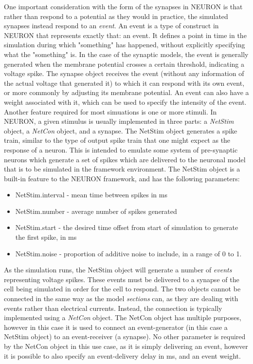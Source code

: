 One important consideration with the form of the synapses in NEURON is that rather than respond to a potential as they would in practice, the simulated synapses instead respond to an \emph{event}. An event is a type of construct in NEURON that represents exactly that: an event. It defines a point in time in the simulation during which "something" has happened, without explicitly specifying what the "something" is. In the case of the synaptic models, the event is generally generated when the membrane potential crosses a certain threshold, indicating a voltage spike. The synapse object receives the event (without any information of the actual voltage that generated it) to which it can respond with its own event, or more commonly by adjusting its membrane potential. An event can also have a weight associated with it, which can be used to specify the intensity of the event.
\\
Another feature required for most simuations is one or more stimuli. In NEURON, a given stimulus is usually implemented in three parts: a \emph{NetStim} object, a \emph{NetCon} object, and a synapse. The NetStim object generates a spike train, similar to the type of output spike train that one might expect as the response of a neuron. This is intended to emulate some system of pre-synaptic neurons which generate a set of spikes which are delivered to the neuronal model that is to be simulated in the framework environment. The NetStim object is a built-in feature to the NEURON framework, and has the following parameters:
\begin{itemize}
    \item NetStim.interval - mean time between spikes in ms
    \item NetStim.number - average number of spikes generated
    \item NetStim.start - the desired time offset from start of simulation to generate the first spike, in ms
    \item NetStim.noise - proportion of additive noise to include, in a range of 0 to 1.
\end{itemize}
As the simulation runs, the NetStim object will generate a number of \emph{events} representing voltage spikes. These events must be delivered to a synapse of the cell being simulated in order for the cell to respond. The two objects cannot be connected in the same way as the model \emph{sections} can, as they are dealing with events rather than electrical currents. Instead, the connection is typically implemented using a \emph{NetCon} object. The NetCon object has multiple purposes, however in this case it is used to connect an event-generator (in this case a NetStim object) to an event-receiver (a synapse). No other parameter is required by the NetCon object in this use case, as it is simply delivering an event, however it is possible to also specify an event-delivery delay in ms, and an event weight.\\

